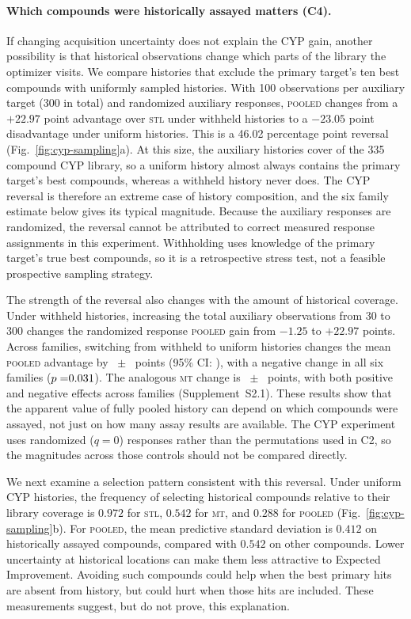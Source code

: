 \documentclass[10pt,letterpaper,runningheads]{llncs}
\newcommand{\stl}{\textsc{stl}}
\newcommand{\mt}{\textsc{mt}}
\newcommand{\pooled}{\textsc{pooled}}
\begin{document}
\paragraph{Which compounds were historically assayed matters (C4).}
If changing acquisition uncertainty does not explain the CYP gain,
another possibility is that historical observations change which
parts of the library the optimizer visits. We compare histories that
exclude the primary target's ten best compounds with uniformly
sampled histories. With 100 observations per auxiliary target
(300 in total) and randomized auxiliary responses, \pooled{} changes
from a $+22.97$ point advantage over \stl{} under withheld histories
to a $-23.05$ point disadvantage under uniform histories. This is
a 46.02 percentage point reversal (Fig.~\ref{fig:cyp-sampling}a).
At this size, the auxiliary histories cover \avoidCoverageHundred{} of
the 335 compound CYP library, so a uniform history almost always
contains the primary target's best compounds, whereas a withheld history
never does. The CYP reversal is therefore an extreme case of history
composition, and the six family estimate below gives its typical
magnitude.
Because the auxiliary responses are randomized, the reversal cannot
be attributed to correct measured response assignments in this
experiment. Withholding uses knowledge of the primary target's true
best compounds, so it is a retrospective stress test, not a feasible
prospective sampling strategy.

The strength of the reversal also changes with the amount of
historical coverage. Under withheld histories, increasing the total
auxiliary observations from 30 to 300 changes the randomized response
\pooled{} gain from $-1.25$ to $+22.97$ points. Across families,
switching from withheld to uniform histories changes the mean
\pooled{} advantage by \valPooledDesignChange{}~$\pm$~
\semPooledDesignChange{} points (95\% CI:
\ciPooledDesignChange{}), with a negative change in all six
families ($p=\pPooledDesignChange{}$). The analogous \mt{} change is
\valMtDesignChange{}~$\pm$~\semMtDesignChange{} points, with both
positive and negative effects across families (Supplement~S2.1).
These results show that the apparent value of fully pooled history
can depend on which compounds were assayed, not just on how many
assay results are available. The CYP experiment uses randomized
($q=0$) responses rather than the permutations used in C2, so the
magnitudes across those controls should not be compared directly.

We next examine a selection pattern consistent with this reversal.
Under uniform CYP histories, the frequency of selecting historical
compounds relative to their library coverage is $0.972$ for \stl{},
$0.542$ for \mt{}, and $0.288$ for \pooled{}
(Fig.~\ref{fig:cyp-sampling}b). For \pooled{}, the mean predictive
standard deviation is $0.412$ on historically assayed compounds,
compared with $0.542$ on other compounds. Lower uncertainty at
historical locations can make them less attractive to Expected
Improvement. Avoiding such compounds could help when the best primary
hits are absent from history, but could hurt when those hits are
included. These measurements suggest, but do not prove, this
explanation.
\end{document}
